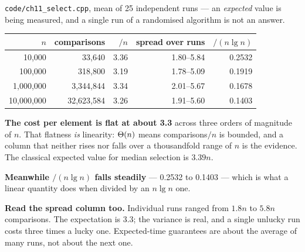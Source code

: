 \begin{worked}
\texttt{code/ch11\_select.cpp}, mean of 25 independent runs --- an
\emph{expected} value is being measured, and a single run of a randomised
algorithm is not an answer.

\begin{center}
\begin{tabular}{@{}rrrrr@{}}
\toprule
\rowcolor{primary!15}
$n$ & comparisons & $/n$ & spread over runs & $/(n\lg n)$ \\
\midrule
   10{,}000 &      33{,}640 & 3.36 & 1.80--5.84 & 0.2532 \\
  100{,}000 &     318{,}800 & 3.19 & 1.78--5.09 & 0.1919 \\
1{,}000{,}000 &   3{,}344{,}844 & 3.34 & 2.01--5.67 & 0.1678 \\
10{,}000{,}000 &  32{,}623{,}584 & 3.26 & 1.91--5.60 & 0.1403 \\
\bottomrule
\end{tabular}
\end{center}

\smallskip
\textbf{The cost per element is flat at about 3.3} across three orders of
magnitude of $n$. That flatness \emph{is} linearity: $\Theta(n)$ means
comparisons$/n$ is bounded, and a column that neither rises nor falls over a
thousandfold range of $n$ is the evidence. The classical expected value for
median selection is $3.39n$.

\smallskip
\textbf{Meanwhile $/(n\lg n)$ falls steadily} --- 0.2532 to 0.1403 --- which is
what a linear quantity does when divided by an $n\lg n$ one.

\smallskip
\textbf{Read the spread column too.} Individual runs ranged from $1.8n$ to
$5.8n$ comparisons. The expectation is 3.3; the variance is real, and a single
unlucky run costs three times a lucky one. Expected-time guarantees are about
the average of many runs, not about the next one.
\end{worked}

